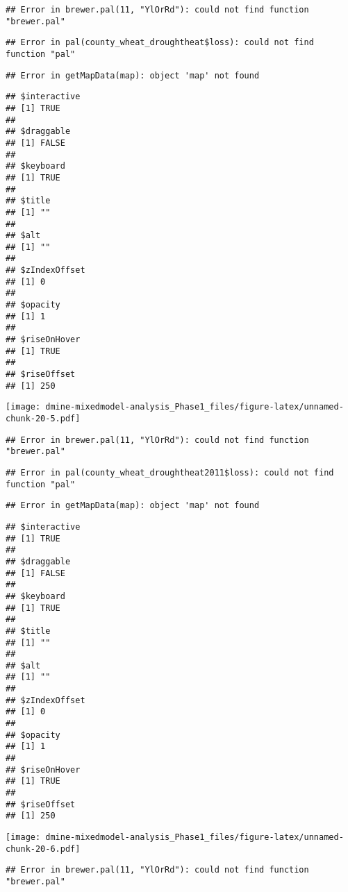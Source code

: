 \documentclass[]{article}
\begin{document}
\begin{verbatim}
## Error in brewer.pal(11, "YlOrRd"): could not find function "brewer.pal"
\end{verbatim}

\begin{verbatim}
## Error in pal(county_wheat_droughtheat$loss): could not find function "pal"
\end{verbatim}

\begin{verbatim}
## Error in getMapData(map): object 'map' not found
\end{verbatim}

\begin{verbatim}
## $interactive
## [1] TRUE
## 
## $draggable
## [1] FALSE
## 
## $keyboard
## [1] TRUE
## 
## $title
## [1] ""
## 
## $alt
## [1] ""
## 
## $zIndexOffset
## [1] 0
## 
## $opacity
## [1] 1
## 
## $riseOnHover
## [1] TRUE
## 
## $riseOffset
## [1] 250
\end{verbatim}

\texttt{[image: dmine-mixedmodel-analysis\_Phase1\_files/figure-latex/unnamed-chunk-20-5.pdf]}

\begin{verbatim}
## Error in brewer.pal(11, "YlOrRd"): could not find function "brewer.pal"
\end{verbatim}

\begin{verbatim}
## Error in pal(county_wheat_droughtheat2011$loss): could not find function "pal"
\end{verbatim}

\begin{verbatim}
## Error in getMapData(map): object 'map' not found
\end{verbatim}

\begin{verbatim}
## $interactive
## [1] TRUE
## 
## $draggable
## [1] FALSE
## 
## $keyboard
## [1] TRUE
## 
## $title
## [1] ""
## 
## $alt
## [1] ""
## 
## $zIndexOffset
## [1] 0
## 
## $opacity
## [1] 1
## 
## $riseOnHover
## [1] TRUE
## 
## $riseOffset
## [1] 250
\end{verbatim}

\texttt{[image: dmine-mixedmodel-analysis\_Phase1\_files/figure-latex/unnamed-chunk-20-6.pdf]}

\begin{verbatim}
## Error in brewer.pal(11, "YlOrRd"): could not find function "brewer.pal"
\end{verbatim}
\end{document}
